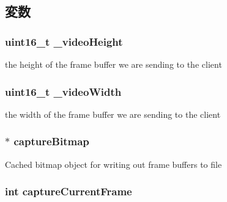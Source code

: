 \subsection{変数}
\hypertarget{classVncInput_a4c78948caaa18275e1209fd368b7b3a7}{
\subsubsection[{\_\-videoHeight}]{\setlength{\rightskip}{0pt plus 5cm}uint16\_\-t {\bf \_\-videoHeight}}}
\label{classVncInput_a4c78948caaa18275e1209fd368b7b3a7}
the height of the frame buffer we are sending to the client \hypertarget{classVncInput_a51050d82c013629b320e37c76436d25a}{
\subsubsection[{\_\-videoWidth}]{\setlength{\rightskip}{0pt plus 5cm}uint16\_\-t {\bf \_\-videoWidth}}}
\label{classVncInput_a51050d82c013629b320e37c76436d25a}
the width of the frame buffer we are sending to the client \hypertarget{classVncInput_a43674e3b3f10249c09c1eefeb039a282}{
\subsubsection[{captureBitmap}]{$\ast$ {\bf captureBitmap}}}
\label{classVncInput_a43674e3b3f10249c09c1eefeb039a282}
Cached bitmap object for writing out frame buffers to file \hypertarget{classVncInput_aad01931dab0d55404625cb7ac28dc350}{
\subsubsection[{captureCurrentFrame}]{\setlength{\rightskip}{0pt plus 5cm}int {\bf captureCurrentFrame}}}
